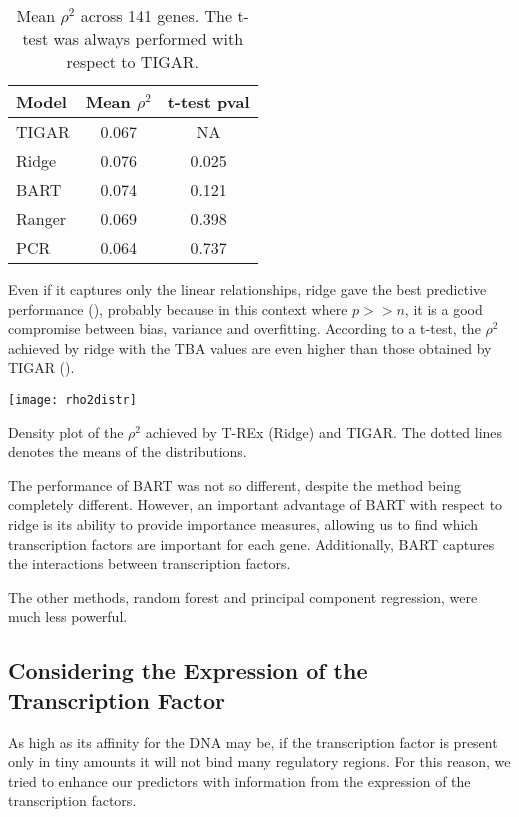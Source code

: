 \begin{table}[b]
  \caption{Mean $\rho^2$ across 141 genes. The t-test was always 
performed with respect to TIGAR.}
  \begin{tabular}{lcc}
  \textbf{Model} & \textbf{Mean} \boldmath$\rho^2$ & \textbf{t-test pval} \\
  \midrule
  TIGAR & 0.067 & NA\\
  Ridge & 0.076 & 0.025\\
  BART & 0.074 & 0.121\\
  Ranger & 0.069 & 0.398\\
  PCR & 0.064 & 0.737\\
  \end{tabular}
\end{table}

Even if it captures only the linear relationships, ridge gave the best 
predictive performance (), probably because in this 
context where $p >> n$, it is a good compromise between bias, variance 
and overfitting. According to a t-test, the $\rho^2$ achieved by ridge 
with the TBA values are even higher than those obtained by TIGAR 
().

\begin{marginfigure}[-2cm]
  \texttt{[image: rho2distr]}
  \caption{Density plot of the $\rho^2$ achieved by T-REx (Ridge) and 
TIGAR. The dotted lines denotes the means of the 
distributions.}
\end{marginfigure}

The performance of BART was not so different, despite the method being 
completely different. However, an important advantage of BART with 
respect to ridge is its ability to provide importance measures, allowing 
us to find which transcription factors are important for each gene. 
Additionally, BART captures the interactions between transcription 
factors.

The other methods, random forest and principal component regression, 
were much less powerful.

\subsection{Considering the Expression of the Transcription Factor}

As high as its affinity for the DNA may be, if the transcription factor 
is present only in tiny amounts it will not bind many regulatory 
regions. For this reason, we tried to enhance our predictors with 
information from the expression of the transcription factors.

